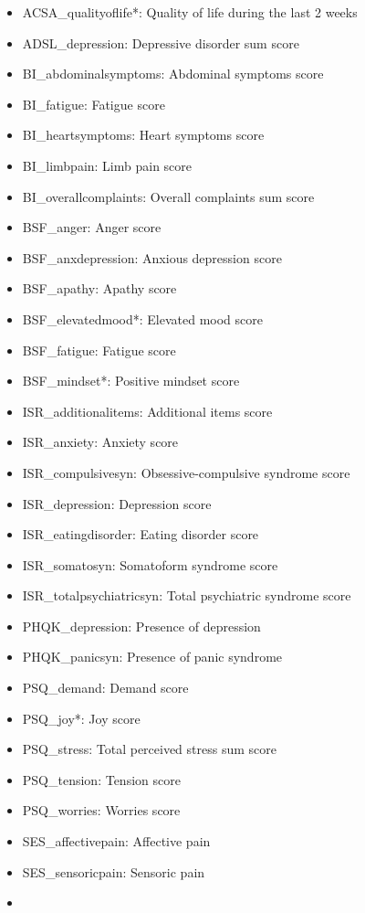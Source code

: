 \documentclass[
  oneside]{book}
\providecommand{\tightlist}{%
  \setlength{\itemsep}{0pt}\setlength{\parskip}{0pt}}
\begin{document}
\begin{itemize}
\tightlist
\item
  ACSA\_qualityoflife*: Quality of life during the last 2 weeks
\item
  ADSL\_depression: Depressive disorder sum score
\item
  BI\_abdominalsymptoms: Abdominal symptoms score
\item
  BI\_fatigue: Fatigue score
\item
  BI\_heartsymptoms: Heart symptoms score
\item
  BI\_limbpain: Limb pain score
\item
  BI\_overallcomplaints: Overall complaints sum score
\item
  BSF\_anger: Anger score
\item
  BSF\_anxdepression: Anxious depression score
\item
  BSF\_apathy: Apathy score
\item
  BSF\_elevatedmood*: Elevated mood score
\item
  BSF\_fatigue: Fatigue score
\item
  BSF\_mindset*: Positive mindset score
\item
  ISR\_additionalitems: Additional items score
\item
  ISR\_anxiety: Anxiety score
\item
  ISR\_compulsivesyn: Obsessive-compulsive syndrome score
\item
  ISR\_depression: Depression score
\item
  ISR\_eatingdisorder: Eating disorder score
\item
  ISR\_somatosyn: Somatoform syndrome score
\item
  ISR\_totalpsychiatricsyn: Total psychiatric syndrome score
\item
  PHQK\_depression: Presence of depression
\item
  PHQK\_panicsyn: Presence of panic syndrome
\item
  PSQ\_demand: Demand score
\item
  PSQ\_joy*: Joy score
\item
  PSQ\_stress: Total perceived stress sum score
\item
  PSQ\_tension: Tension score
\item
  PSQ\_worries: Worries score
\item
  SES\_affectivepain: Affective pain
\item
  SES\_sensoricpain: Sensoric pain
\item

\end{itemize}
\end{document}
